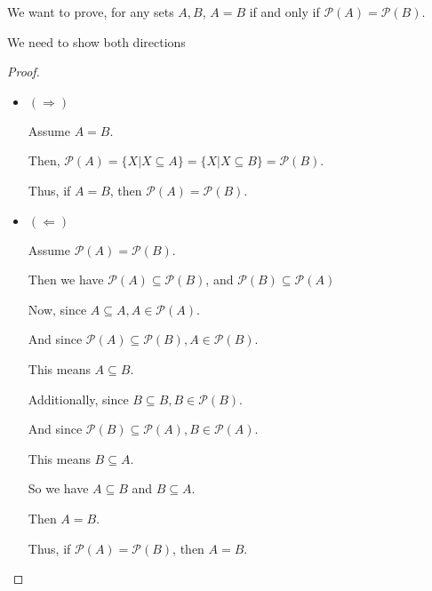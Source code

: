 \documentclass[12pt,letterpaper]{article}
\begin{document}
\begin{enumerate}
\begin{enumerate}
          We want to prove, for any sets $A, B$, $A = B$ if and only if $\mathcal{P}(A) = \mathcal{P}(B)$.

          We need to show both directions

          \begin{proof}
            \begin{itemize}
              \item $(\Longrightarrow)$

              Assume $A = B$.

              Then, $\mathcal{P}(A) = \{X | X \subseteq A\} = \{X | X \subseteq B\} = \mathcal{P}(B)$.

              Thus, if $A = B$, then $\mathcal{P}(A) = \mathcal{P}(B)$.

              \item $(\Longleftarrow)$

              Assume $\mathcal{P}(A) = \mathcal{P}(B)$.

              Then we have $\mathcal{P}(A) \subseteq \mathcal{P}(B)$, and $\mathcal{P}(B) \subseteq \mathcal{P}(A)$

              Now, since $A \subseteq A, A \in \mathcal{P}(A)$.

              And since $\mathcal{P}(A) \subseteq \mathcal{P}(B), A \in \mathcal{P}(B)$.

              This means $A \subseteq B$.

              Additionally,
              since $B \subseteq B, B \in \mathcal{P}(B)$.

              And since $\mathcal{P}(B) \subseteq \mathcal{P}(A), B \in \mathcal{P}(A)$.

              This means $B \subseteq A$.

              So we have $A \subseteq B$ and $B \subseteq A$.

              Then $A = B$.

              Thus, if $\mathcal{P}(A) = \mathcal{P}(B)$, then $A = B$.
            \end{itemize}


\end{proof}
\end{enumerate}
\end{enumerate}
\end{document}
